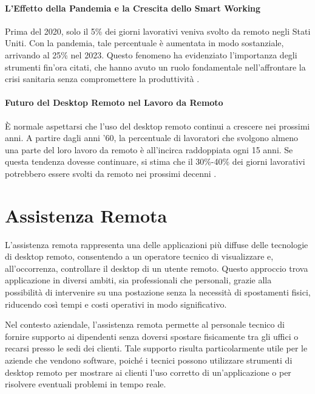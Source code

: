 \documentclass[12pt,a4paper,openright,twoside]{book}
\begin{document}
\paragraph{L'Effetto della Pandemia e la Crescita dello Smart Working}

Prima del 2020, solo il 5\% dei giorni lavorativi veniva svolto da remoto negli Stati Uniti. Con la pandemia, tale percentuale è aumentata in modo sostanziale, arrivando al 25\% nel 2023. Questo fenomeno ha evidenziato l'importanza degli strumenti fin'ora citati, che hanno avuto un ruolo fondamentale nell'affrontare la crisi sanitaria senza compromettere la produttività \cite{Barrero2023}.

\paragraph{Futuro del Desktop Remoto nel Lavoro da Remoto}
È normale aspettarsi che l'uso del desktop remoto continui a crescere nei prossimi anni. A partire dagli anni '60, la percentuale di lavoratori che svolgono almeno una parte del loro lavoro da remoto è all'incirca raddoppiata ogni 15 anni. Se questa tendenza dovesse continuare, si stima che il 30\%-40\% dei giorni lavorativi potrebbero essere svolti da remoto nei prossimi decenni \cite{Barrero2023}.



\section{Assistenza Remota}
\label{sec:remote-assistance}

L'assistenza remota rappresenta una delle applicazioni più diffuse delle tecnologie di desktop remoto, consentendo a un operatore tecnico di visualizzare e, all'occorrenza, controllare il desktop di un utente remoto. Questo approccio trova applicazione in diversi ambiti, sia professionali che personali, grazie alla possibilità di intervenire su una postazione senza la necessità di spostamenti fisici, riducendo così tempi e costi operativi in modo significativo.

Nel contesto aziendale, l'assistenza remota permette al personale tecnico di fornire supporto ai dipendenti senza doversi spostare fisicamente tra gli uffici o recarsi presso le sedi dei clienti. Tale supporto risulta particolarmente utile per le aziende che vendono software, poiché i tecnici possono utilizzare strumenti di desktop remoto per mostrare ai clienti l'uso corretto di un'applicazione o per risolvere eventuali problemi in tempo reale. 
\end{document}

